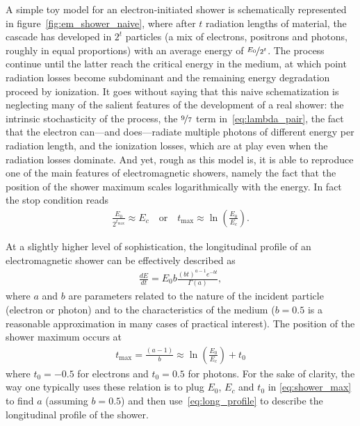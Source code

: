 \begin{marginfigure}
  
  \caption{Sketch of the development of an electron-induced electromagnetic shower
  in the simplest possible toy model.}
  \label{fig:em_shower_naive}
\end{marginfigure}

A simple toy model for an electron-initiated shower is schematically represented
in figure~\ref{fig:em_shower_naive}, where after $t$ radiation lengths of material,
the cascade has developed in $2^t$ particles (a mix of electrons, positrons and
photons, roughly in equal proportions) with an average energy of $\nicefrac{E_0}{2^t}$.
The process continue until the latter reach the critical energy in the medium,
at which point radiation losses become subdominant and the remaining energy
degradation proceed by ionization.
It goes without saying that this naive schematization is neglecting many of the
salient features of the development of a real shower: the intrinsic stochasticity
of the process, the $\nicefrac{9}{7}$ term in~\eqref{eq:lambda_pair}, the fact
that the electron can---and does---radiate multiple photons of different energy
per radiation length, and the ionization losses, which are at play even when the
radiation losses dominate. And yet, rough as this model is, it is able to reproduce
one of the main features of electromagnetic showers, namely the fact that the
position of the shower maximum scales logarithmically with the energy. In fact the
stop condition reads
\begin{align}
  \frac{E_0}{2^{t_\text{max}}} \approx E_c
  \quad\text{or}\quad
  t_\text{max} \approx \ln \left(\frac{E_0}{E_c}\right).
\end{align}

\begin{marginfigure}
  
  \caption{Average longitudinal profile of the shower generated by a
     $100$~GeV electron in a homogeneous slab of BGO.}
  \label{fig:shower_longitudinal_profile}
\end{marginfigure}

At a slightly higher level of sophistication, the longitudinal profile of an
electromagnetic shower can be effectively described as
\begin{align}\label{eq:long_profile}
  \frac{dE}{dt} = E_0 b \frac{(bt)^{a-1} e^{-bt}}{\Gamma(a)},
\end{align}
where $a$ and $b$ are parameters related to the nature of the incident particle
(electron or photon) and to the characteristics of the medium ($b = 0.5$
is a reasonable approximation in many cases of practical interest).
The position of the shower maximum occurs at
\begin{align}\label{eq:shower_max}
  t_\text{max} = \frac{(a - 1)}{b} \approx
  \ln \left(\frac{E_0}{E_c}\right) + t_0
\end{align}
where $t_0 = -0.5$ for electrons and $t_0 = 0.5$ for photons. For the sake
of clarity, the way one typically uses these relation is to plug $E_0$, $E_c$
and $t_0$ in \eqref{eq:shower_max} to find $a$ (assuming $b = 0.5$) and then
use~\eqref{eq:long_profile} to describe the longitudinal profile of the shower.

